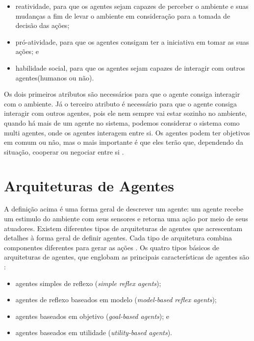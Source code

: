 \begin{itemize}
	\item reatividade, para que os agentes sejam capazes de perceber o ambiente e suas mudanças a fim de levar o ambiente em consideração para a tomada de decisão das ações;
	\item pró-atividade, para que os agentes consigam ter a iniciativa em tomar as suas ações; e
	\item habilidade social, para que os agentes sejam capazes de interagir com outros agentes(humanos ou não).
\end{itemize}

Os dois primeiros atributos são necessários para que o agente consiga interagir com o ambiente. 
Já o terceiro atributo é necessário para que o agente consiga interagir com outros agentes, pois ele nem sempre vai estar sozinho no ambiente, quando há mais de um agente no sistema, podemos considerar o sistema como multi agentes, onde os agentes interagem entre si. 
Os agentes podem ter objetivos em comum ou não, mas o mais importante é que eles terão que, dependendo da situação, cooperar ou negociar entre si \cite{intelligence2003modern}.

\section{Arquiteturas de Agentes}
A definição  acima é uma forma geral de descrever um agente: um agente recebe um estimulo do ambiente com seus sensores e retorna uma ação por meio de seus atuadores. 
Existem diferentes tipos de arquiteturas de agentes que acrescentam detalhes à forma geral de definir agentes. 
Cada tipo de arquitetura combina componentes diferentes para gerar as ações \cite{intelligence2003modern}. Os quatro tipos básicos de arquiteturas de agentes, que englobam as principais características de agentes são \cite{intelligence2003modern}: 

\begin{itemize}
	\item agentes simples de reflexo (\emph{simple reflex agents});
	\item agentes de reflexo baseados em modelo (\emph{model-based reflex agents});
	\item agentes baseados em objetivo (\emph{goal-based agents}); e
	\item agentes baseados em utilidade (\emph{utility-based agents}). 
\end{itemize}  

